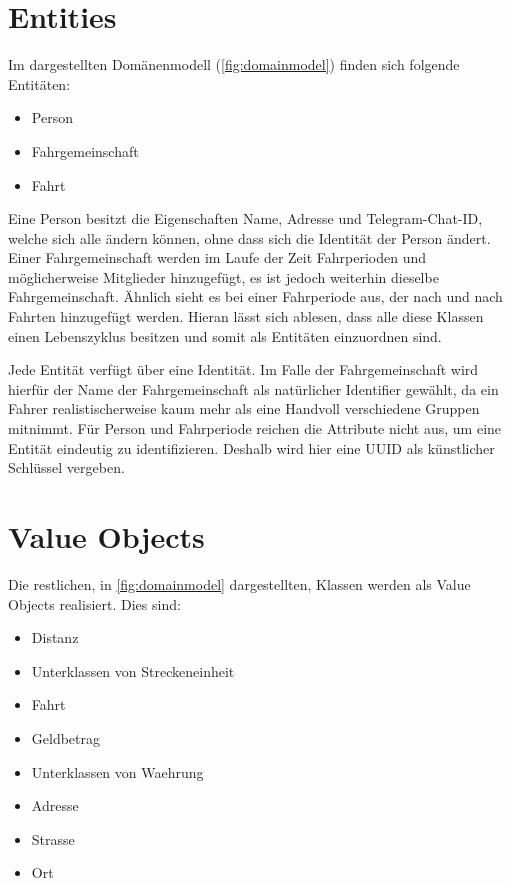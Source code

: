 \section{Entities}
Im dargestellten Domänenmodell (\autoref{fig:domainmodel}) finden sich folgende Entitäten:

\begin{itemize}
    \item Person
    \item Fahrgemeinschaft
    \item Fahrt
\end{itemize}

Eine Person besitzt die Eigenschaften Name, Adresse und Telegram-Chat-ID, welche sich alle ändern können, ohne dass sich die Identität der Person ändert.
Einer Fahrgemeinschaft werden im Laufe der Zeit Fahrperioden und möglicherweise Mitglieder hinzugefügt, es ist jedoch weiterhin dieselbe Fahrgemeinschaft.
Ähnlich sieht es bei einer Fahrperiode aus, der nach und nach Fahrten hinzugefügt werden.
Hieran lässt sich ablesen, dass alle diese Klassen einen Lebenszyklus besitzen und somit als Entitäten einzuordnen sind.

Jede Entität verfügt über eine Identität.
Im Falle der Fahrgemeinschaft wird hierfür der Name der Fahrgemeinschaft als natürlicher Identifier gewählt, da ein Fahrer realistischerweise kaum mehr als eine Handvoll verschiedene Gruppen mitnimmt.
Für Person und Fahrperiode reichen die Attribute nicht aus, um eine Entität eindeutig zu identifizieren.
Deshalb wird hier eine UUID als künstlicher Schlüssel vergeben.

\section{Value Objects}
Die restlichen, in \autoref{fig:domainmodel} dargestellten, Klassen werden als Value Objects realisiert.
Dies sind:

\begin{itemize}
    \item Distanz
    \item Unterklassen von Streckeneinheit
    \item Fahrt
    \item Geldbetrag
    \item Unterklassen von Waehrung
    \item Adresse
    \item Strasse
    \item Ort
\end{itemize}

